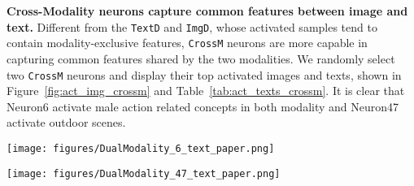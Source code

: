 \textbf{Cross-Modality neurons capture common features between image and text.} Different from the \texttt{TextD} and \texttt{ImgD}, whose activated samples tend to contain modality-exclusive features, \texttt{CrossM} neurons are more capable in capturing common features shared by the two modalities. We randomly select two \texttt{CrossM} neurons and display their top activated images and texts, shown in Figure~\ref{fig:act_img_crossm} and Table~\ref{tab:act_texts_crossm}. It is clear that Neuron6 activate male action related concepts in both modality and Neuron47 activate outdoor scenes.


\begin{minipage}{0.5\textwidth} 
\centering
   \texttt{[image: figures/DualModality\_6\_text\_paper.png]} 

   \texttt{[image: figures/DualModality\_47\_text\_paper.png]}

   
\label{fig:act_img_crossm}
\end{minipage}
\hfill
\begin{minipage}{0.5\textwidth}
\centering
{}
\vspace{-2mm}
\label{tab:act_texts_crossm}
\end{minipage}
